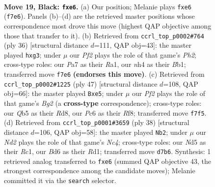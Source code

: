 \documentclass[11pt]{article}
\begin{document}
\clearpage

\begin{figure}[p]\centering
\begin{subfigure}{0.46\textwidth}\centering
\resizebox{\linewidth}{!}{%
\newchessgame
\chessboard[
  setfen={r6r/p2nkp1p/2pbP1p1/1q1n2P1/Np1P3N/4P2P/PP6/R1BQ1RK1 b - - 0 19},
  showmover=false,
  pgfstyle=straightmove, color=movearrow, markmove={f7-e6}
]}
\caption{}
\end{subfigure}\hfill
\begin{subfigure}{0.46\textwidth}\centering
\resizebox{\linewidth}{!}{%
\newchessgame
\chessboard[
  setfen={r1b1qrk1/1p1n1p2/7p/3p2p1/2pP4/p1P1P1n1/P2N1PPP/RBQ2RK1 w - - 0 19},
  showmover=false,
  pgfstyle=straightmove, color=movearrow, markmove={h2-g3}
]}
\caption{}
\end{subfigure}
\\[4pt]
\begin{subfigure}{0.46\textwidth}\centering
\resizebox{\linewidth}{!}{%
\newchessgame
\chessboard[
  setfen={3r1r2/pq4bk/1p4pp/2pNRp2/1PP1n3/P2P2PP/1B3P2/1R1Q2K1 b - - 2 24},
  showmover=false,
  pgfstyle=straightmove, color=movearrow, markmove={g7-e5}
]}
\caption{}
\end{subfigure}\hfill
\begin{subfigure}{0.46\textwidth}\centering
\resizebox{\linewidth}{!}{%
\newchessgame
\chessboard[
  setfen={r1bqr1k1/6bp/2p1ppp1/1p1n4/2NP1P2/PQN1P3/5PBP/2RR2K1 w - - 0 20},
  showmover=false,
  pgfstyle=straightmove, color=movearrow, markmove={c4-b2}
]}
\caption{}
\end{subfigure}
\caption{\textbf{Move 19, Black: \texttt{fxe6}.} (a) Our position; Melanie plays \texttt{fxe6} (\texttt{f7e6}). Panels (b)--(d) are the retrieved master positions whose correspondence most drove this move (highest QAP objective among those that transfer to it). (b) Retrieved from \texttt{ccrl\_top\_p0002\#764} (ply 36) [structural distance $d$=111, QAP obj=43]: the master played \texttt{hxg3}; under $\mu$ our \emph{Pf2} plays the role of that game's \emph{Ph2}; cross-type roles: our \emph{P}a7 as their \emph{R}a1, our \emph{n}h4 as their \emph{B}b1; transferred move \texttt{f7e6} \textbf{(endorses this move)}. (c) Retrieved from \texttt{ccrl\_top\_p0002\#1225} (ply 47) [structural distance $d$=108, QAP obj=66]: the master played \texttt{Bxe5}; under $\mu$ our \emph{Pf2} plays the role of that game's \emph{Bg2} (a \textbf{cross-type} correspondence); cross-type roles: our \emph{Q}b5 as their \emph{R}d8, our \emph{P}c6 as their \emph{R}f8; transferred move \texttt{f7f5}. (d) Retrieved from \texttt{ccrl\_top\_p0001\#3659} (ply 38) [structural distance $d$=106, QAP obj=58]: the master played \texttt{Nb2}; under $\mu$ our \emph{Nd2} plays the role of that game's \emph{Nc4}; cross-type roles: our \emph{N}d5 as their \emph{R}c1, our \emph{B}d6 as their \emph{R}d1; transferred move \texttt{d7b6}. Synthesis: 1 retrieved analog transferred to \texttt{fxe6} (summed QAP objective 43, the strongest correspondence among the candidate moves); Melanie committed it via the \texttt{search} selector.}
\label{fig:thought-m37}
\end{figure}
\end{document}
